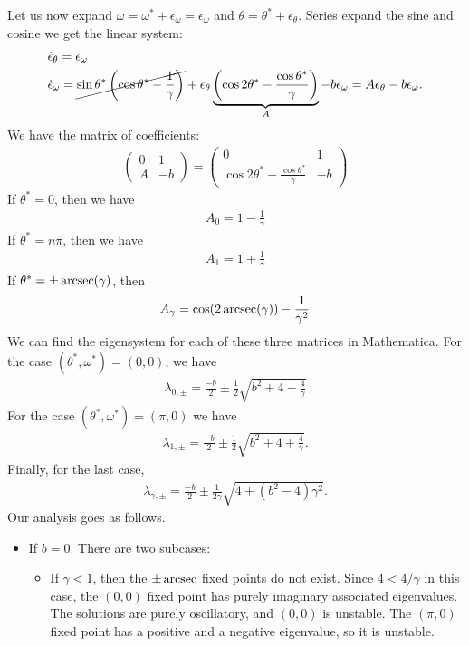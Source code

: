 \documentclass{article}
\theoremstyle{definition}
\newcommand{\f}[2]{\frac{#1}{#2}}
\newcommand{\lp}{\left(}
\newcommand{\rp}{\right)}
\begin{document}
\begin{enumerate}[label=(\alph*)]
	
	Let us now expand $\omega = \omega^* + \epsilon_\omega = \epsilon_\omega$ and $\theta = \theta^* + \epsilon_\theta$. Series expand the sine and cosine we get the linear system:
	\begin{align*}
	&\dot \epsilon_\theta = \epsilon_\omega \\
	&\dot \epsilon_\omega = \cancel{\sin\theta^*\lp \cos\theta^* - \f{1}{\gamma} \rp } + \epsilon_\theta \underbrace{\lp \cos 2 \theta^* - \f{\cos\theta^*}{\gamma}\rp}_{A} -b \epsilon_\omega = A \epsilon_\theta - b \epsilon_\omega.
	\end{align*}
	We have the matrix of coefficients:
	\begin{align*}
	\begin{pmatrix}
	0 & 1 \\ 
	A & -b 
	\end{pmatrix}
	= \begin{pmatrix}
	0 & 1 \\ 
	\cos 2 \theta^* - \f{\cos\theta^*}{\gamma} & -b 
	\end{pmatrix}
	\end{align*}
	If $\theta^* =0$, then we have
	\begin{align*}
	A_{0} = 1 - \f{1}{\gamma}
	\end{align*}
	If $\theta^* = n\pi$, then we have
	\begin{align*}
	A_{1} = 1 + \f{1}{\gamma}
	\end{align*}
	If $\theta^* = \pm \arcsec(\gamma)$, then 
	\begin{align*}
	A_\gamma = \cos (2 \arcsec(\gamma)) - \f{1}{\gamma^2}
	\end{align*}
	We can find the eigensystem for each of these three matrices in Mathematica. For the case $(\theta^*, \omega^*) = (0,0)$, we have
	\begin{align*}
	\lambda_{0,\pm} = \f{-b}{2} \pm \f{1}{2}\sqrt{b^2+4 - \f{4}{\gamma}}
	\end{align*}
	For the case $(\theta^*, \omega^*) = (\pi,0)$ we have
	\begin{align*}
	\lambda_{1,\pm} = \f{-b}{2} \pm \f{1}{2}\sqrt{b^2+4 + \f{4}{\gamma}}.
	\end{align*}
	Finally, for the last case,
	\begin{align*}
	\lambda_{\gamma,\pm} = \f{-b}{2} \pm \f{1}{2\gamma}\sqrt{4 + (b^2-4)\gamma^2}.
	\end{align*}
	Our analysis goes as follows.
	\begin{itemize}
		\item If $b = 0$. There are two subcases:
		\begin{itemize}
			\item If $\gamma < 1$, then the $\pm \arcsec$ fixed points do not exist. Since $4 <  4/\gamma$ in this case, the $(0,0)$ fixed point has purely imaginary associated eigenvalues. The solutions are purely oscillatory, and $(0,0)$ is unstable.  The $(\pi,0)$ fixed point has a positive and a negative eigenvalue, so it is unstable. 
			

\end{itemize}
\end{itemize}
\end{enumerate}
\end{document}
